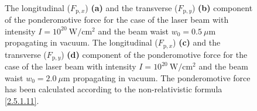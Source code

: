 \begin{figure}[h!]
	\centering
	\\
	\caption{The longitudinal ($ F_{\mathrm{p}, x} $) \textbf{(a)} and the transverse ($ F_{\mathrm{p}, y} $) \textbf{(b)} component of the ponderomotive force for the case of the laser beam with intensity $ I = 10^{20} \ \mathrm{W/cm^2} $ and the beam waist $ w_0 = 0.5 \ \mu\mathrm{m} $ propagating in vacuum. The longitudinal ($ F_{\mathrm{p}, x} $) \textbf{(c)} and the transverse ($ F_{\mathrm{p}, y} $) \textbf{(d)} component of the ponderomotive force for the case of the laser beam with intensity $ I = 10^{20} \ \mathrm{W/cm^2} $ and the beam waist $ w_0 = 2.0 \ \mu\mathrm{m} $ propagating in vacuum. The ponderomotive force has been calculated according to the non-relativistic formula \ref{2.5.1.11}.}
	\label{fig:21}
\end{figure}

